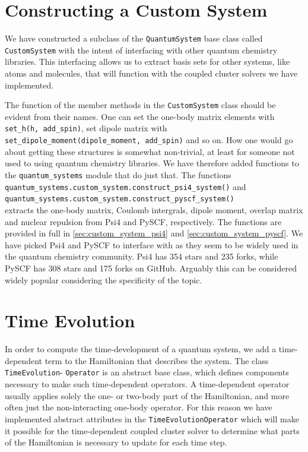 

\section{Constructing a Custom System}

We have constructed a subclass of the \lstinline{QuantumSystem} base 
class called \lstinline{CustomSystem} with the intent of interfacing with 
other quantum chemistry libraries. This interfacing allows us to extract basis 
sets for other systems, like atoms and molecules, that will function with the
coupled cluster solvers we have implemented.



The function of the member methods in the \lstinline{CustomSystem} class
should be evident from their names. One can set the one-body matrix elements with 
\lstinline{set_h(h, add_spin)}, set dipole matrix with 
\lstinline{set_dipole_moment(dipole_moment, add_spin)} and so on. How one would go about 
getting these structures is somewhat non-trivial, at least for someone not used 
to using quantum chemistry libraries. We have therefore added functions 
to the \lstinline{quantum_systems} module that do just that. The functions \\
\indent\lstinline{quantum_systems.custom_system.construct_psi4_system()} and \\
\indent\lstinline{quantum_systems.custom_system.construct_pyscf_system()} \\
extracts the one-body matrix, Coulomb intergrals, dipole moment, overlap matrix and
nuclear repulsion from Psi4\cite{parrish2017psi4} and PySCF\cite{PYSCF}, respectively.
The functions are provided in full in \autoref{sec:custom_system_psi4} and 
\autoref{sec:custom_system_pyscf}.
We have picked Psi4 and PySCF to interface with as they seem to be widely used in the 
quantum chemistry community. Psi4 has 354 stars and 235 forks, while PySCF has 308 stars
and 175 forks on GitHub. Arguably this can be considered  widely popular considering 
the specificity of the topic.

\section{Time Evolution}

In order to compute the time-development of a quantum system, we add a
time-dependent term to the Hamiltonian that describes the system. The class 
\lstinline{TimeEvolution}- \lstinline{Operator}
is an abstract base class, which defines
components necessary to make such time-dependent operators. A time-dependent 
operator usually applies solely the one- or two-body part of the Hamiltonian, and 
more often just the non-interacting one-body operator. For this reason we have implemented 
abstract attributes in the \lstinline{TimeEvolutionOperator} which will make it 
possible for the time-dependent coupled cluster solver to determine what parts 
of the Hamiltonian is necessary to update for each time step.

